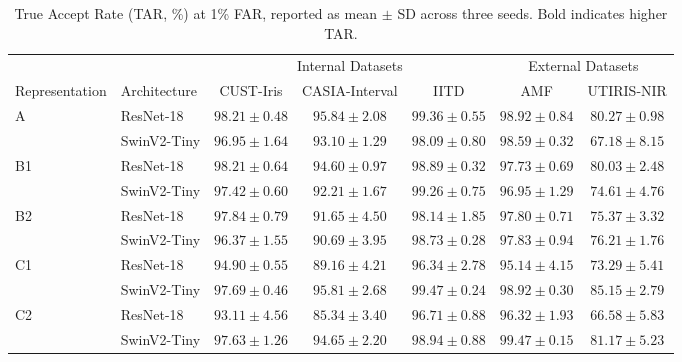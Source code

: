 \begin{table}[!t]
\centering
\caption{True Accept Rate (TAR, \%) at 1\% FAR, reported as mean $\pm$ SD across three seeds. Bold indicates higher TAR.}
\label{tab:supp-tar1-performance}
\begingroup
\small
\setlength{\tabcolsep}{3.2pt}
\renewcommand{\arraystretch}{1.12}
\begin{tabular*}{\textwidth}{@{\extracolsep{\fill}}llccccc@{}}
\toprule
& & \multicolumn{3}{c}{Internal Datasets} & \multicolumn{2}{c}{External Datasets} \\
\cmidrule(lr){3-5}\cmidrule(l){6-7}
Representation & Architecture & CUST-Iris & CASIA-Interval & IITD & AMF & UTIRIS-NIR \\
\midrule
\multirow{2}{*}{A} & ResNet-18 & {\boldmath $98.21 \pm 0.48$} & {\boldmath $95.84 \pm 2.08$} & {\boldmath $99.36 \pm 0.55$} & {\boldmath $98.92 \pm 0.84$} & {\boldmath $80.27 \pm 0.98$} \\
 & SwinV2-Tiny & $96.95 \pm 1.64$ & $93.10 \pm 1.29$ & $98.09 \pm 0.80$ & $98.59 \pm 0.32$ & $67.18 \pm 8.15$ \\
\midrule
\multirow{2}{*}{B1} & ResNet-18 & {\boldmath $98.21 \pm 0.64$} & {\boldmath $94.60 \pm 0.97$} & $98.89 \pm 0.32$ & {\boldmath $97.73 \pm 0.69$} & {\boldmath $80.03 \pm 2.48$} \\
 & SwinV2-Tiny & $97.42 \pm 0.60$ & $92.21 \pm 1.67$ & {\boldmath $99.26 \pm 0.75$} & $96.95 \pm 1.29$ & $74.61 \pm 4.76$ \\
\midrule
\multirow{2}{*}{B2} & ResNet-18 & {\boldmath $97.84 \pm 0.79$} & {\boldmath $91.65 \pm 4.50$} & $98.14 \pm 1.85$ & $97.80 \pm 0.71$ & $75.37 \pm 3.32$ \\
 & SwinV2-Tiny & $96.37 \pm 1.55$ & $90.69 \pm 3.95$ & {\boldmath $98.73 \pm 0.28$} & {\boldmath $97.83 \pm 0.94$} & {\boldmath $76.21 \pm 1.76$} \\
\midrule
\multirow{2}{*}{C1} & ResNet-18 & $94.90 \pm 0.55$ & $89.16 \pm 4.21$ & $96.34 \pm 2.78$ & $95.14 \pm 4.15$ & $73.29 \pm 5.41$ \\
 & SwinV2-Tiny & {\boldmath $97.69 \pm 0.46$} & {\boldmath $95.81 \pm 2.68$} & {\boldmath $99.47 \pm 0.24$} & {\boldmath $98.92 \pm 0.30$} & {\boldmath $85.15 \pm 2.79$} \\
\midrule
\multirow{2}{*}{C2} & ResNet-18 & $93.11 \pm 4.56$ & $85.34 \pm 3.40$ & $96.71 \pm 0.88$ & $96.32 \pm 1.93$ & $66.58 \pm 5.83$ \\
 & SwinV2-Tiny & {\boldmath $97.63 \pm 1.26$} & {\boldmath $94.65 \pm 2.20$} & {\boldmath $98.94 \pm 0.88$} & {\boldmath $99.47 \pm 0.15$} & {\boldmath $81.17 \pm 5.23$} \\
\bottomrule
\end{tabular*}
\par\vspace{3pt}
\endgroup
\end{table}

